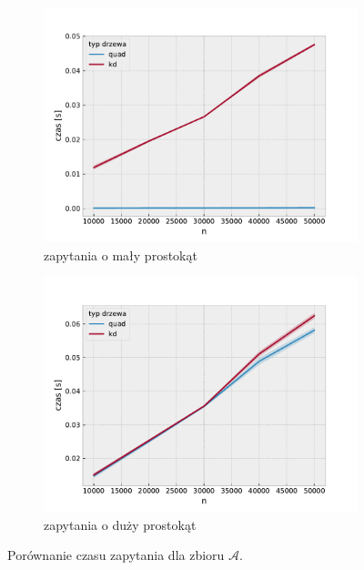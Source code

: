 \documentclass[12pt]{scrartcl}
\newcommand{\sA}{\mathcal A}
\begin{document}
\begin{figure}[H]
    \begin{subfigure}{0.5\textwidth}
        \includegraphics[width=\textwidth]{imgs/uniform_find_small_time}
        \caption{zapytania o mały prostokąt}
        \label{fig:uniform find small time}
    \end{subfigure}
    \begin{subfigure}{0.5\textwidth}
        \includegraphics[width=\textwidth]{imgs/uniform_find_big_time}
        \caption{zapytania o duży prostokąt}
        \label{fig:uniform find big time}
    \end{subfigure}
    \caption{Porównanie czasu zapytania dla zbioru $\sA$.}
\end{figure}
\end{document}
